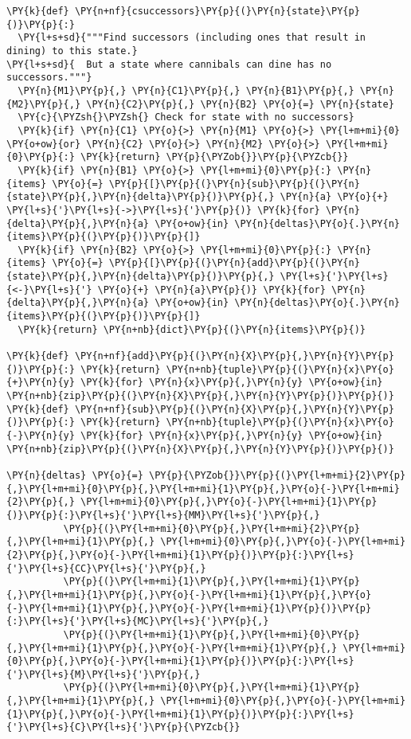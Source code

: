 \begin{Verbatim}[commandchars=\\\{\}]
\PY{k}{def} \PY{n+nf}{csuccessors}\PY{p}{(}\PY{n}{state}\PY{p}{)}\PY{p}{:}
  \PY{l+s+sd}{"""Find successors (including ones that result in dining) to this state.}
\PY{l+s+sd}{  But a state where cannibals can dine has no successors."""}
  \PY{n}{M1}\PY{p}{,} \PY{n}{C1}\PY{p}{,} \PY{n}{B1}\PY{p}{,} \PY{n}{M2}\PY{p}{,} \PY{n}{C2}\PY{p}{,} \PY{n}{B2} \PY{o}{=} \PY{n}{state}
  \PY{c}{\PYZsh{}\PYZsh{} Check for state with no successors}
  \PY{k}{if} \PY{n}{C1} \PY{o}{>} \PY{n}{M1} \PY{o}{>} \PY{l+m+mi}{0} \PY{o+ow}{or} \PY{n}{C2} \PY{o}{>} \PY{n}{M2} \PY{o}{>} \PY{l+m+mi}{0}\PY{p}{:} \PY{k}{return} \PY{p}{\PYZob{}}\PY{p}{\PYZcb{}}
  \PY{k}{if} \PY{n}{B1} \PY{o}{>} \PY{l+m+mi}{0}\PY{p}{:} \PY{n}{items} \PY{o}{=} \PY{p}{[}\PY{p}{(}\PY{n}{sub}\PY{p}{(}\PY{n}{state}\PY{p}{,}\PY{n}{delta}\PY{p}{)}\PY{p}{,} \PY{n}{a} \PY{o}{+} \PY{l+s}{'}\PY{l+s}{->}\PY{l+s}{'}\PY{p}{)} \PY{k}{for} \PY{n}{delta}\PY{p}{,}\PY{n}{a} \PY{o+ow}{in} \PY{n}{deltas}\PY{o}{.}\PY{n}{items}\PY{p}{(}\PY{p}{)}\PY{p}{]}
  \PY{k}{if} \PY{n}{B2} \PY{o}{>} \PY{l+m+mi}{0}\PY{p}{:} \PY{n}{items} \PY{o}{=} \PY{p}{[}\PY{p}{(}\PY{n}{add}\PY{p}{(}\PY{n}{state}\PY{p}{,}\PY{n}{delta}\PY{p}{)}\PY{p}{,} \PY{l+s}{'}\PY{l+s}{<-}\PY{l+s}{'} \PY{o}{+} \PY{n}{a}\PY{p}{)} \PY{k}{for} \PY{n}{delta}\PY{p}{,}\PY{n}{a} \PY{o+ow}{in} \PY{n}{deltas}\PY{o}{.}\PY{n}{items}\PY{p}{(}\PY{p}{)}\PY{p}{]}
  \PY{k}{return} \PY{n+nb}{dict}\PY{p}{(}\PY{n}{items}\PY{p}{)}

\PY{k}{def} \PY{n+nf}{add}\PY{p}{(}\PY{n}{X}\PY{p}{,}\PY{n}{Y}\PY{p}{)}\PY{p}{:} \PY{k}{return} \PY{n+nb}{tuple}\PY{p}{(}\PY{n}{x}\PY{o}{+}\PY{n}{y} \PY{k}{for} \PY{n}{x}\PY{p}{,}\PY{n}{y} \PY{o+ow}{in} \PY{n+nb}{zip}\PY{p}{(}\PY{n}{X}\PY{p}{,}\PY{n}{Y}\PY{p}{)}\PY{p}{)}
\PY{k}{def} \PY{n+nf}{sub}\PY{p}{(}\PY{n}{X}\PY{p}{,}\PY{n}{Y}\PY{p}{)}\PY{p}{:} \PY{k}{return} \PY{n+nb}{tuple}\PY{p}{(}\PY{n}{x}\PY{o}{-}\PY{n}{y} \PY{k}{for} \PY{n}{x}\PY{p}{,}\PY{n}{y} \PY{o+ow}{in} \PY{n+nb}{zip}\PY{p}{(}\PY{n}{X}\PY{p}{,}\PY{n}{Y}\PY{p}{)}\PY{p}{)}

\PY{n}{deltas} \PY{o}{=} \PY{p}{\PYZob{}}\PY{p}{(}\PY{l+m+mi}{2}\PY{p}{,}\PY{l+m+mi}{0}\PY{p}{,}\PY{l+m+mi}{1}\PY{p}{,}\PY{o}{-}\PY{l+m+mi}{2}\PY{p}{,} \PY{l+m+mi}{0}\PY{p}{,}\PY{o}{-}\PY{l+m+mi}{1}\PY{p}{)}\PY{p}{:}\PY{l+s}{'}\PY{l+s}{MM}\PY{l+s}{'}\PY{p}{,}
          \PY{p}{(}\PY{l+m+mi}{0}\PY{p}{,}\PY{l+m+mi}{2}\PY{p}{,}\PY{l+m+mi}{1}\PY{p}{,} \PY{l+m+mi}{0}\PY{p}{,}\PY{o}{-}\PY{l+m+mi}{2}\PY{p}{,}\PY{o}{-}\PY{l+m+mi}{1}\PY{p}{)}\PY{p}{:}\PY{l+s}{'}\PY{l+s}{CC}\PY{l+s}{'}\PY{p}{,}
          \PY{p}{(}\PY{l+m+mi}{1}\PY{p}{,}\PY{l+m+mi}{1}\PY{p}{,}\PY{l+m+mi}{1}\PY{p}{,}\PY{o}{-}\PY{l+m+mi}{1}\PY{p}{,}\PY{o}{-}\PY{l+m+mi}{1}\PY{p}{,}\PY{o}{-}\PY{l+m+mi}{1}\PY{p}{)}\PY{p}{:}\PY{l+s}{'}\PY{l+s}{MC}\PY{l+s}{'}\PY{p}{,}
          \PY{p}{(}\PY{l+m+mi}{1}\PY{p}{,}\PY{l+m+mi}{0}\PY{p}{,}\PY{l+m+mi}{1}\PY{p}{,}\PY{o}{-}\PY{l+m+mi}{1}\PY{p}{,} \PY{l+m+mi}{0}\PY{p}{,}\PY{o}{-}\PY{l+m+mi}{1}\PY{p}{)}\PY{p}{:}\PY{l+s}{'}\PY{l+s}{M}\PY{l+s}{'}\PY{p}{,}
          \PY{p}{(}\PY{l+m+mi}{0}\PY{p}{,}\PY{l+m+mi}{1}\PY{p}{,}\PY{l+m+mi}{1}\PY{p}{,} \PY{l+m+mi}{0}\PY{p}{,}\PY{o}{-}\PY{l+m+mi}{1}\PY{p}{,}\PY{o}{-}\PY{l+m+mi}{1}\PY{p}{)}\PY{p}{:}\PY{l+s}{'}\PY{l+s}{C}\PY{l+s}{'}\PY{p}{\PYZcb{}}


\end{Verbatim}
